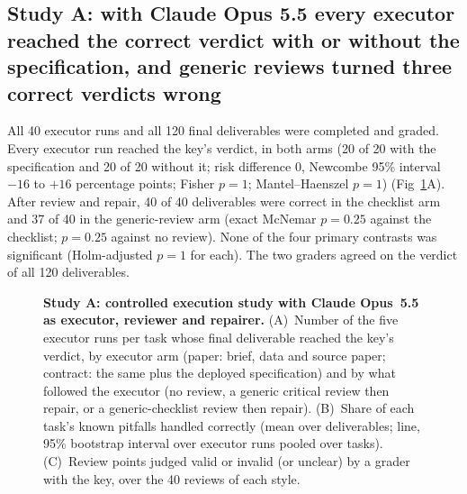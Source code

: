 \documentclass[10pt,letterpaper]{article}
\begin{document}
\subsection*{Study A: with Claude Opus 5.5 every executor reached the correct verdict with or without the specification, and generic reviews turned three correct verdicts wrong}
All 40 executor runs and all 120 final deliverables were completed and
graded. Every executor run reached the key's verdict, in both arms (20 of
20 with the specification and 20 of 20 without it; risk difference 0,
Newcombe 95\% interval $-16$ to $+16$ percentage points; Fisher
$p = 1$; Mantel--Haenszel $p = 1$) (Fig~\ref{fig:studyA}A). After review
and repair, 40 of 40 deliverables were correct in the checklist arm and 37
of 40 in the generic-review arm (exact McNemar $p = 0.25$ against the
checklist; $p = 0.25$ against no review). None of the four primary
contrasts was significant (Holm-adjusted $p = 1$ for each). The two
graders agreed on the verdict of all 120 deliverables.

\begin{figure}[H]
\caption{\textbf{Study A: controlled execution study with Claude Opus~5.5
as executor, reviewer and repairer.} (A)~Number of the five executor runs
per task whose final deliverable reached the key's verdict, by executor
arm (paper: brief, data and source paper; contract: the same plus the
deployed specification) and by what followed the executor (no review, a
generic critical review then repair, or a generic-checklist review then
repair). (B)~Share of each task's known pitfalls handled correctly (mean
over deliverables; line, 95\% bootstrap interval over executor runs
pooled over tasks).
(C)~Review points judged valid or invalid (or unclear) by a grader with
the key, over the 40 reviews of each style.}
\label{fig:studyA}
\end{figure}
\end{document}
